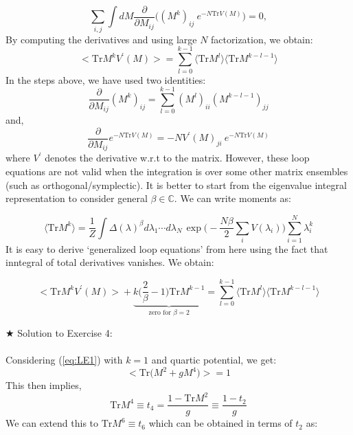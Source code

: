 \documentclass[11pt]{article}
\begin{document}
\begin{equation}
	\sum_{i,j} \int dM \frac{\partial}{\partial M_{ij}} \Bigg( (M^k)_{ij}~e^{-N\mathrm{Tr} V(M)}\Bigg) = 0, 
\end{equation}
By computing the derivatives and using large $N$ factorization, we obtain:
\begin{equation}
	\Big< \mathrm{Tr} M^{k} V^{\prime}(M) \Big> = \sum_{l=0}^{k-1} \langle \mathrm{Tr} M^{l} \rangle  \langle \mathrm{Tr} M^{k-l-1} \rangle
\end{equation}
In the steps above, we have used two identities:
\begin{equation}
	\frac{\partial}{\partial M_{ij}} (M^{k})_{ij} = \sum_{l=0}^{k-1} (M^{l})_{ii} (M^{k-l-1})_{jj}
\end{equation}
and, 
\begin{equation}
	\frac{\partial}{\partial M_{ij}} e^{-N\mathrm{Tr} V(M)} = -N V^{\prime}(M)_{ji}~e^{-N\mathrm{Tr} V(M)}
\end{equation}
where $V^{\prime}$ denotes the derivative w.r.t to the matrix. 
However, these loop equations are not valid when the integration is over some other matrix ensembles (such as orthogonal/symplectic). It is better to start from the eigenvalue integral representation to consider general $\beta \in \mathbb{C}$. We can write moments as:

\begin{equation} 
\langle \mbox{Tr} M^k  \rangle = \frac{1}{Z} \int \Delta(\lambda)^{\beta} 
	d\lambda_1 \cdots d\lambda_{N~} \exp\Bigg(-\frac{N\beta}{2} \sum_{i} V(\lambda_{i})\Bigg)  \sum_{i=1}^{N} \lambda_{i}^k
\end{equation}
It is easy to derive `generalized loop equations' from here using the fact that inntegral of total derivatives vanishes. We obtain:

\begin{equation}
		\Big< \mathrm{Tr} M^{k} V^{\prime}(M) \Big> +  \underbrace{k \Bigg(\frac{2}{\beta} - 1 \Bigg) \mathrm{Tr} M^{k-1}}_{\text{zero for $\beta=2$}} = \sum_{l=0}^{k-1} \langle \mathrm{Tr} M^{l} \rangle  \langle \mathrm{Tr} M^{k-l-1} \rangle
\end{equation}
 

\noindent $\bigstar$ Solution to Exercise 4:
\\ \\ Considering (\ref{eq:LE1}) with $k=1$ and quartic potential, we get: 
    \begin{equation}
    \Big< \mathrm{Tr}\Big(M^{2} + g M^{4}\Big) \Big> = 1 
    \end{equation}
    This then implies, 
     \begin{equation}
     \mathrm{Tr} M^{4} \equiv t_{4} = \frac{1 - \mathrm{Tr} M^{2}}{g} \equiv \frac{1 - t_2}{g} 
     \end{equation}
     We can extend this to $\mathrm{Tr} M^{6} \equiv t_{6}$ which can be obtained in terms of 
     $t_2$ as:  
     
\end{document}
